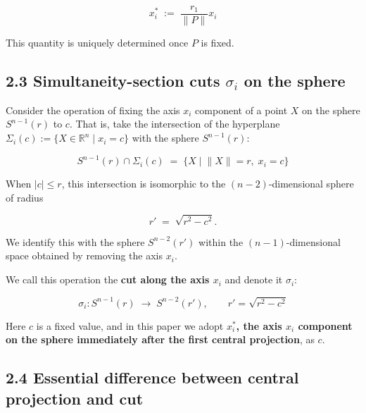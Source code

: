\documentclass[a4paper,11pt]{article}
\theoremstyle{definition}
\theoremstyle{remark}
\begin{document}
\[
x_i^{*} \;:=\; \frac{r_1}{\lVert P\rVert} x_i
\]

This quantity is uniquely determined once \(P\) is fixed.

\subsection{\texorpdfstring{2.3 Simultaneity-section cuts \(\sigma_i\)
on the
sphere}{2.3 Simultaneity-section cuts \textbackslash sigma\_i on the sphere}}\label{simultaneity-section-cuts-sigma_i-on-the-sphere}

Consider the operation of fixing the axis \(x_i\) component of a point
\(X\) on the sphere \(S^{n-1}(r)\) to \(c\). That is, take the
intersection of the hyperplane
\(\Sigma_i(c) := \{X \in \mathbb{R}^n \mid x_i = c\}\) with the sphere
\(S^{n-1}(r)\):

\[
S^{n-1}(r) \cap \Sigma_i(c) \;=\; \bigl\{X \;\big|\; \lVert X\rVert = r,\; x_i = c\bigr\}
\]

When \(|c| \leq r\), this intersection is isomorphic to the
\((n-2)\)-dimensional sphere of radius

\[
r' \;=\; \sqrt{r^{2} - c^{2}}.
\]

We identify this with the sphere \(S^{n-2}(r')\) within the
\((n-1)\)-dimensional space obtained by removing the axis \(x_i\).

We call this operation the \textbf{cut along the axis \(x_i\)} and
denote it \(\sigma_i\):

\[
\sigma_{i}: S^{n-1}(r) \;\longrightarrow\; S^{n-2}(r'), \qquad r' = \sqrt{r^{2} - c^{2}}
\]

Here \(c\) is a fixed value, and in this paper we adopt
\textbf{\(x_i^{*}\), the axis \(x_i\) component on the sphere
immediately after the first central projection}, as \(c\).

\subsection{2.4 Essential difference between central projection and
cut}\label{essential-difference-between-central-projection-and-cut}
\end{document}
